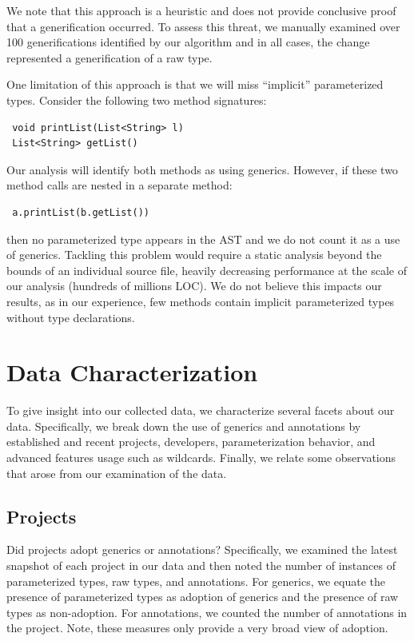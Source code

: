 \documentclass{svjour3}
\newcommand{\todo}[1]{}
\begin{document}
We note that this approach is a heuristic and does not provide 
conclusive proof that a generification occurred.  To
assess this threat, we manually examined over 100 generifications
identified by our algorithm and in all cases, the change represented a
generification of a raw type.

One limitation of this approach is that we will miss ``implicit'' parameterized types.
Consider the following two method signatures:

\begin{lstlisting}
 void printList(List<String> l)
 List<String> getList()
\end{lstlisting}

Our analysis will identify both methods as using generics.  However,
if these two method calls are nested in a separate method:

\begin{lstlisting}
 a.printList(b.getList())
\end{lstlisting}

\noindent
then no parameterized type appears in the AST and we do not count it as a use of
generics.  Tackling this problem would require a static analysis beyond the
bounds of an individual source file, heavily decreasing performance at the
scale of our analysis (hundreds of millions LOC).  We do not believe this impacts
our results, as in our experience, few methods
contain implicit parameterized types without type declarations.
\todo{Is there evidence for this?}

\section{Data Characterization}\label{sec:data}

To give insight into our collected data, we characterize several facets about our data.
Specifically, we break down the use of generics and annotations by established and recent projects, developers, parameterization behavior,
and advanced features usage such as wildcards.  Finally, we relate some observations that arose from our examination of the data.

\subsection{Projects}

Did projects adopt generics or annotations? 
Specifically, we examined the latest snapshot of each project in our data and 
then noted the number of instances of parameterized types, raw types, and annotations. 
For generics, we equate the presence of parameterized types as adoption of generics and the presence of raw types as non-adoption.  
For annotations, we counted the number of annotations in the project.  Note, these measures only provide a very broad view of adoption.  
\end{document}
